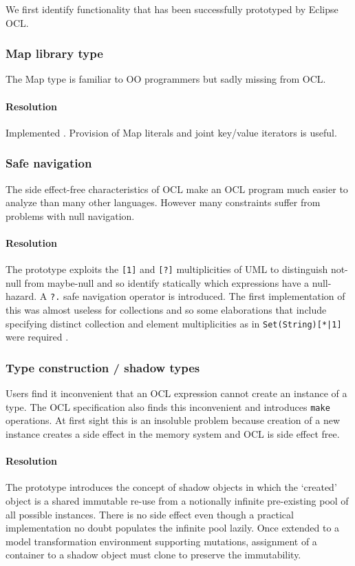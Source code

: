 \documentclass{jot}
\begin{document}
We  first identify functionality that has been successfully prototyped by Eclipse OCL.

\subsubsection{Map library type}

The Map type is familiar to OO programmers but sadly missing from OCL.

\paragraph{Resolution} Implemented \cite{Willink-Map}. Provision of Map literals and joint key/value iterators is useful.

\subsubsection{Safe navigation}\label{Safe navigation}

The side effect-free characteristics of OCL make an OCL program much easier to analyze than many other languages. However many constraints suffer from problems with null navigation.

\paragraph{Resolution} The prototype exploits the \verb$[1]$ and \verb$[?]$ multiplicities of UML to distinguish not-null from maybe-null and so identify statically which expressions have a null-hazard. A \verb$?.$ safe navigation operator is introduced. The first implementation of this was almost useless for collections and so some elaborations that include specifying distinct collection and element multiplicities as in \verb$Set(String)[*|1]$ were required \cite{Willink-Safe}.

\subsubsection{Type construction / shadow types}

Users find it inconvenient that an OCL expression cannot create an instance of a type. The OCL specification also finds this inconvenient and introduces \verb$make$ operations. At first sight this is an insoluble problem because creation of a new instance creates a side effect in the memory system and OCL is side effect free.

\paragraph{Resolution} The prototype introduces the concept of shadow objects \cite{Willink-Shadow} in which the `created' object is a shared immutable re-use from a notionally infinite pre-existing pool of all possible instances. There is no side effect even though a practical implementation no doubt populates the infinite pool lazily. Once extended to a model transformation environment supporting mutations, assignment of a container to a shadow object must clone to preserve the immutability.
\end{document}
